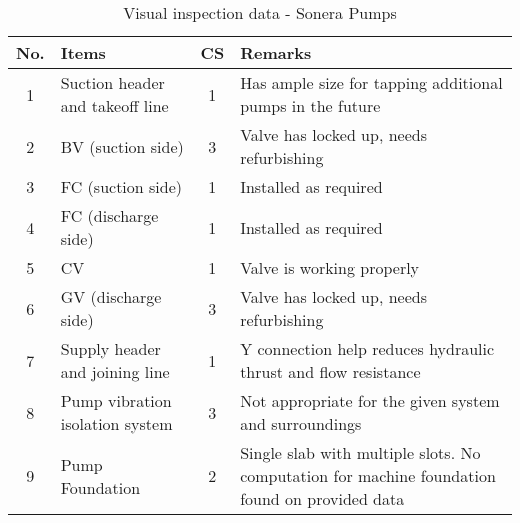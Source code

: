 \begin{table}[!htb]
	\caption{Visual inspection data - Sonera Pumps}
	\label{ch043_tbl_visualinspectionSON}
		{\scriptsize
\begin{tabular}{c|l|c|p{9.5cm}}

\hline
No. & Items & CS & Remarks \\ 
\hline
1 & Suction header and takeoff line & 1 & Has ample size for tapping additional pumps in the future \\ 
2 & BV (suction side) & 3 & Valve has locked up, needs refurbishing \\ 
3 & FC (suction side) & 1 & Installed as required \\ 
4 & FC (discharge side) & 1 & Installed as required \\ 
5 & CV & 1 & Valve is working properly \\ 
6 & GV (discharge side) & 3 & Valve has locked up, needs refurbishing \\ 
7 & Supply header and joining line & 1 & Y connection help reduces hydraulic thrust and flow resistance \\ 
8 & Pump vibration isolation system & 3 & Not appropriate for the given system and surroundings \\ 
9 & Pump Foundation & 2 & Single slab with multiple slots. No computation for machine foundation found on provided data \\ 
\hline

\end{tabular}
	}
\end{table}
